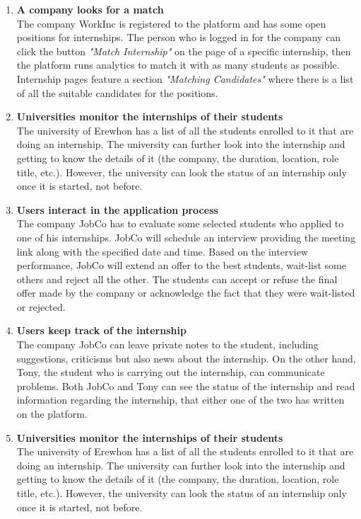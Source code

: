 \begin{enumerate}
            \item \textbf{A company looks for a match}   
            \\The company WorkInc is registered to the platform and has some open positions for internships. The person who is logged in for the company can click the button \textit{"Match Internship"} on the page of a specific internship, then the platform runs analytics to match it with as many students as possible. Internship pages feature a section \textit{"Matching Candidates"} where there is a list of all the suitable candidates for the positions. 

            \item \textbf{Universities monitor the internships of their students }
            \\ The university of Erewhon has a list of all the students enrolled to it that are doing an internship. The university can further look into the internship and getting to know the details of it (the company, the duration, location, role title, etc.). However, the university can look the status of an internship only once it is started, not before.
            
            \item \textbf{Users interact in the application process}
            \\ The company JobCo has to evaluate some selected students who applied to one of his internships. JobCo will schedule an interview providing the meeting link along with the specified date and time. Based on the interview performance, JobCo will extend an offer to the best students, wait-list some others and reject all the other. The students can accept or refuse the final offer made by the company or acknowledge the fact that they were wait-listed or rejected.
            
            \item \textbf{Users keep track of the internship }
            \\ The company JobCo can leave private notes to the student, including suggestions, criticisms but also news about the internship. On the other hand, Tony, the student who is carrying out the internship, can communicate problems. Both JobCo and Tony can see the status of the internship and read information regarding the internship, that either one of the two has written on the platform.
            
            \item \textbf{Universities monitor the internships of their students }
            \\ The university of Erewhon has a list of all the students enrolled to it that are doing an internship. The university can further look into the internship and getting to know the details of it (the company, the duration, location, role title, etc.). However, the university can look the status of an internship only once it is started, not before.
        \end{enumerate}
        
